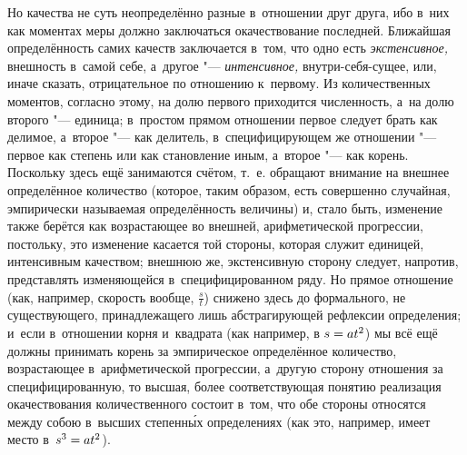 Но качества не суть неопределённо разные в~отношении друг друга, ибо в~них как
моментах меры должно заключаться окачествование последней. Ближайшая
определённость самих качеств заключается в~том, что одно есть
{\em экстенсивное,} внешность в~самой себе, а~другое "--- {\em интенсивное,}
внутри-себя-сущее, или, иначе сказать, отрицательное по отношению к~первому. Из
количественных моментов, согласно этому, на долю первого приходится численность,
а~на долю второго "--- единица; в~простом прямом отношении первое следует
брать как делимое, а~второе "--- как делитель, в~специфицирующем же отношении
"--- первое как степень или как становление иным, а~второе "--- как корень.
Поскольку здесь ещё занимаются счётом, т.~е. обращают внимание на внешнее
определённое количество (которое, таким образом, есть совершенно случайная,
эмпирически называемая определённость величины) и, стало быть, изменение также
берётся как возрастающее во внешней, арифметической прогрессии, постольку,
это изменение касается той стороны, которая служит единицей, интенсивным
качеством; внешнюю же, экстенсивную сторону следует, напротив, представлять
изменяющейся в~специфицированном ряду. Но прямое отношение (как, например,
скорость вообще, $\frac s t$) снижено здесь до формального, не существующего,
принадлежащего лишь абстрагирующей рефлексии определения; и~если в~отношении
корня и~квадрата (как например, в $s\hm=at^2$) мы всё ещё должны принимать
корень за эмпирическое определённое количество, возрастающее в~арифметической
прогрессии, а~другую сторону отношения за специфицированную, то высшая, более
соответствующая понятию реализация окачествования количественного состоит
в~том, что обе стороны относятся между собою в~высших степенн\'{ы}х
определениях (как это, например, имеет место в~$s^3\hm=at^2$).

\subsubremark{}

